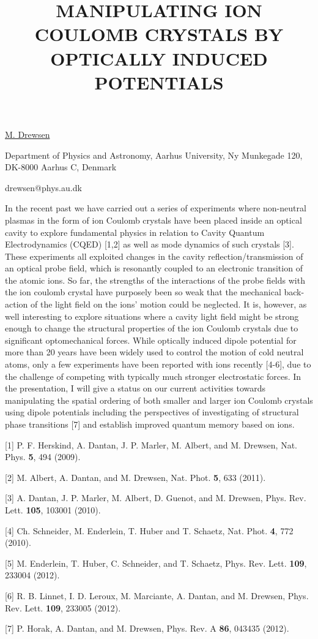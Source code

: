 \title{MANIPULATING ION COULOMB CRYSTALS BY OPTICALLY INDUCED POTENTIALS}

\underline{M. Drewsen} 

{\normalsize{\vspace{-4mm}
Department of Physics and Astronomy,
Aarhus University,
Ny Munkegade 120,
DK-8000 Aarhus C,
Denmark

\email drewsen@phys.au.dk}}

In the recent past we have carried out a series of experiments where non-neutral plasmas in the form of ion Coulomb crystals have been placed inside an optical cavity to explore fundamental physics in relation to Cavity Quantum Electrodynamics (CQED) [1,2] as well as mode dynamics of such crystals [3]. These experiments all exploited changes in the cavity reflection/transmission of an optical probe field, which is resonantly coupled to an electronic transition of the atomic ions. So far, the strengths of the interactions of the probe fields with the ion coulomb crystal have purposely been so weak that the mechanical back-action of the light field on the ions’ motion could be neglected. It is, however, as well interesting to explore situations where a cavity light field might be strong enough to change the structural properties of the ion Coulomb crystals due to significant optomechanical forces. While optically induced dipole potential for more than 20 years have been widely used to control the motion of cold neutral atoms, only a few experiments have been reported with ions recently [4-6], due to the challenge of competing with typically much stronger electrostatic forces.
In the presentation, I will give a status on our current activities towards manipulating the spatial ordering of both smaller and larger ion Coulomb crystals using dipole potentials including the perspectives of investigating of structural phase transitions [7] and establish improved quantum memory based on ions.

{\normalsize
[1]	P. F. Herskind, A. Dantan, J. P. Marler, M. Albert, and M. Drewsen, Nat. Phys. \textbf{5}, 494 (2009).
\vsp

[2]	M. Albert, A. Dantan, and M. Drewsen, Nat. Phot. \textbf{5}, 633 (2011).
\vsp

[3]	A. Dantan, J. P. Marler, M. Albert, D. Guenot, and M. Drewsen, Phys. Rev. Lett. \textbf{105}, 103001 (2010).
\vsp

[4]  Ch. Schneider, M. Enderlein, T. Huber and T. Schaetz,  Nat. Phot. \textbf{4}, 772 (2010).
\vsp

[5]   M. Enderlein, T. Huber, C. Schneider, and T. Schaetz, Phys. Rev. Lett. \textbf{109}, 233004 (2012).
\vsp

[6]   R. B. Linnet, I. D. Leroux, M. Marciante, A. Dantan, and M. Drewsen, Phys. Rev. Lett. \textbf{109}, 233005 (2012).
\vsp

[7]   P. Horak, A. Dantan, and M. Drewsen, Phys. Rev. A \textbf{86}, 043435 (2012).
}


\vspace{\baselineskip}
